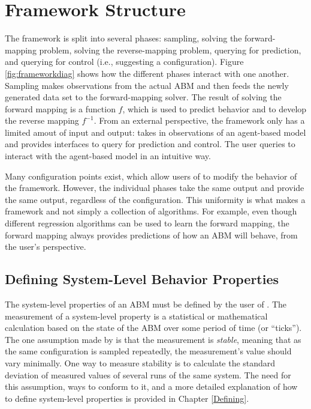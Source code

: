 \section{Framework Structure}

The framework is split into several phases: sampling, solving the forward-mapping problem, solving the reverse-mapping problem, querying for prediction, and querying for control (i.e., suggesting a configuration).
Figure \ref{fig:frameworkdiag} shows how the different phases interact with one another.
Sampling makes observations from the actual ABM and then feeds the newly generated data set to the forward-mapping solver.
The result of solving the forward mapping is a function $f$, which is used to predict behavior and to develop the reverse mapping $f^{-1}$.
From an external perspective, the framework only has a limited amout of input and output:
\fw takes in observations of an agent-based model and provides interfaces to query for prediction and control.
The user queries \fw to interact with the agent-based model in an intuitive way.


Many configuration points exist, which allow users of \fw to modify the behavior of the framework.
However, the individual phases take the same output and provide the same output, regardless of the configuration.
This uniformity is what makes \fw a framework and not simply a collection of algorithms.
For example, even though different regression algorithms can be used to learn the forward mapping, the forward mapping always provides predictions of how an ABM will behave, from the user's perspective.








\subsection{Defining System-Level Behavior Properties}
The system-level properties of an ABM must be defined by the user of \fw.
The measurement of a system-level property is a statistical or mathematical calculation based on the state of the ABM over some period of time (or ``ticks'').
The one assumption made by \fw is that the measurement is \textit{stable}, meaning that as the same configuration is sampled repeatedly, the measurement's value should vary minimally.
One way to measure stability is to calculate the standard deviation of measured values of several runs of the same system.
The need for this assumption, ways to conform to it, and a more detailed explanation of how to define system-level properties is provided in Chapter \ref{Defining}.

